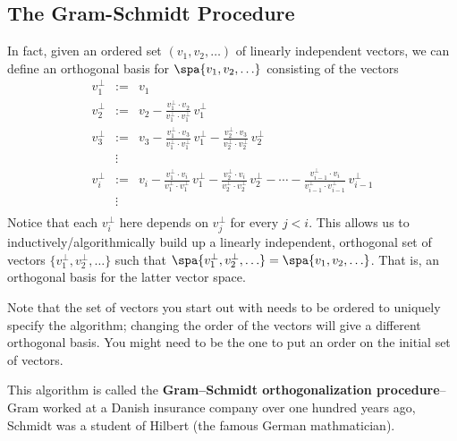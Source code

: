 \subsection{The Gram-Schmidt Procedure}
In fact, given an ordered set $(v_1, v_2, \ldots )$ of linearly independent vectors, we can define an orthogonal basis for $\spa \{v_1,v_2, \ldots \}$ consisting of the  vectors
\begin{eqnarray*}
v_1^\perp&:=&v_1 \\
v_2^\perp &:=& v_2 - \frac{v_1^\perp\cdot v_2}{v_1^\perp\cdot v_1^\perp}\,v_1^\perp \\
v_3^\perp &:=& v_3 - \frac{v_1^\perp\cdot v_3}{v_1^\perp\cdot v_1^\perp}\,v_1^\perp - \frac{v_2^\perp\cdot v_3}{v_2^\perp\cdot v_2^\perp}\,v_2^\perp\\
&\vdots& \\
v_i^\perp%
 &:=& v_i - \frac{v_1^\perp\cdot v_i}{v_1^\perp\cdot v_1^\perp}\,v_1^\perp   
 - \frac{v_2^\perp\cdot v_i}{v_2^\perp\cdot v_2^\perp}\,v_2^\perp -\cdots
 - \frac{v_{i-1}^\perp\cdot v_i}{v_{i-1}^\perp\cdot v_{i-1}^\perp}\,v_{i-1}^\perp\\
&\vdots& \\
\end{eqnarray*}
Notice that each $v_i^\perp$ here depends on  $v_j^\perp$ for every $j<i$.  This allows us to inductively/algorithmically build up a linearly independent, orthogonal set of vectors 
$\{v_1^\perp,v_2^\perp, \ldots \}$ 
such that 
$\spa \{v_1^\perp,v_2^\perp, \ldots \}=\spa \{v_1, v_2, \ldots \}$. 
That is, an orthogonal basis for the latter vector space. 

Note that the set of vectors you start out with needs to be ordered to uniquely specify the algorithm; changing the order of the vectors will give a different orthogonal basis. You might need to be the one to put an order on the initial set of vectors.

This algorithm is called the {\bf Gram--Schmidt orthogonalization procedure}\label{GramSchmidt}--Gram worked at a Danish insurance company over one hundred years ago, Schmidt was a student of Hilbert (the famous German mathmatician).

